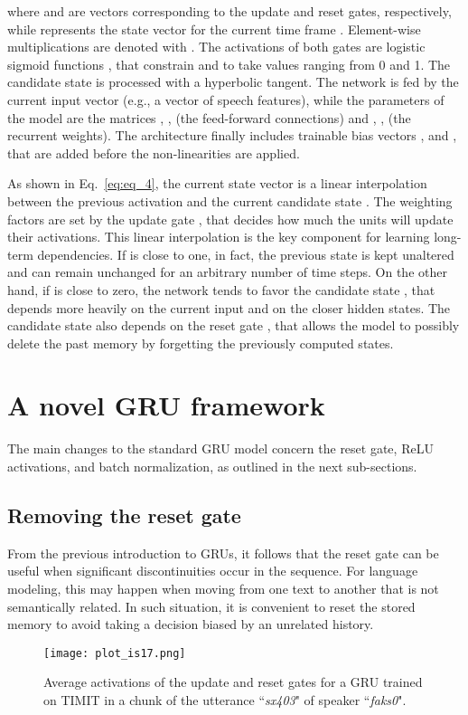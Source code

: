 \documentclass[journal]{IEEEtran}
\begin{document}
where  and  are vectors corresponding to the update and reset gates, respectively, while  represents the state vector for the current time frame .
Element-wise multiplications are denoted with .
The activations of both gates are logistic sigmoid functions , that constrain  and  to take values ranging from 0 and 1. The candidate state  is processed with a hyperbolic tangent. 
The network is fed by the current input vector  (e.g., a vector of speech features), while the parameters of the model are the matrices , ,  (the feed-forward connections) and , ,  (the recurrent weights).
The architecture finally includes trainable bias vectors ,  and , that are added before the non-linearities are applied. 

As shown in Eq.~\ref{eq:eq_4}, the current state vector  is a linear interpolation between the previous activation  and the current candidate state . The weighting factors are set by the update gate , that decides how much the units will update their activations. This linear interpolation is the key component for learning long-term dependencies. If  is close to one, in fact, the previous state is kept unaltered and can remain unchanged for an arbitrary number of time steps. On the other hand, if  is close to zero, the network tends to favor the candidate state , that depends more heavily on the current input and on the closer hidden states. The candidate state  also depends on the reset gate , that allows the model to possibly delete the past memory by forgetting the previously computed states.

\section{A novel GRU framework} \label{sec:novel}
The main changes to the standard GRU model concern the reset gate, ReLU activations, and batch normalization, as outlined in the next sub-sections. 

\subsection{Removing the reset gate}
From the previous introduction to GRUs, it follows that the reset gate can be useful when significant discontinuities occur in the sequence. For language modeling, this may happen when moving from one text to another that is not semantically related. In such situation, it is convenient to reset the stored memory to avoid taking a decision biased by an unrelated history. 
 \begin{figure}[t!]
 \centering
 \texttt{[image: plot\_is17.png]}
 \caption{Average activations of the update and reset gates for a GRU trained on TIMIT in a chunk of the utterance ``\textit{sx403}" of speaker ``\textit{faks0}".}
 \label{fig:im1}
 \end{figure}
\end{document}
